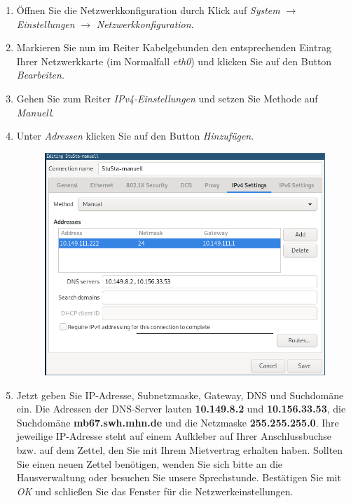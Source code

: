 \documentclass[a4paper,12pt]{scrartcl}
\begin{document}
\begin{enumerate}
	\item Öffnen Sie die Netzwerkkonfiguration durch Klick auf \emph{System} $\rightarrow$ \emph{Einstellungen} $\rightarrow$ \emph{Netzwerkkonfiguration}.
	\item Markieren Sie nun im Reiter Kabelgebunden den entsprechenden Eintrag Ihrer Netzwerkkarte (im Normalfall \emph{eth0}) und klicken Sie auf den Button \emph{Bearbeiten}.
	\item Gehen Sie zum Reiter \emph{IPv4-Einstellungen} und setzen Sie Methode auf \emph{Manuell}.
	\item Unter \emph{Adressen} klicken Sie auf den Button \emph{Hinzufügen}.
	\begin{figure}[h!]
	\centering
		\begin{minipage}[c]{0.5\linewidth}
			\centering
			\includegraphics[width=0.9\linewidth,keepaspectratio]{Bilder/IP_Linux_mb_neu}
			\vspace{-15pt}
		\end{minipage}
	\end{figure}
	\item Jetzt geben Sie IP-Adresse, Subnetzmaske, Gateway, DNS und Suchdomäne ein. Die Adressen der DNS-Server lauten \textbf{10.149.8.2} und \textbf{10.156.33.53}, die Suchdomäne \textbf{mb67.swh.mhn.de} und die Netzmaske \textbf{255.255.255.0}. Ihre jeweilige IP-Adresse steht auf einem Aufkleber auf Ihrer Anschlussbuchse bzw. auf dem Zettel, den Sie mit Ihrem Mietvertrag erhalten haben. Sollten Sie einen neuen Zettel benötigen, wenden Sie sich bitte an die Hausverwaltung oder besuchen Sie unsere Sprechstunde. Bestätigen Sie mit \emph{OK} und schließen Sie das Fenster für die Netzwerkeinstellungen.
\end{enumerate}
\end{document}
